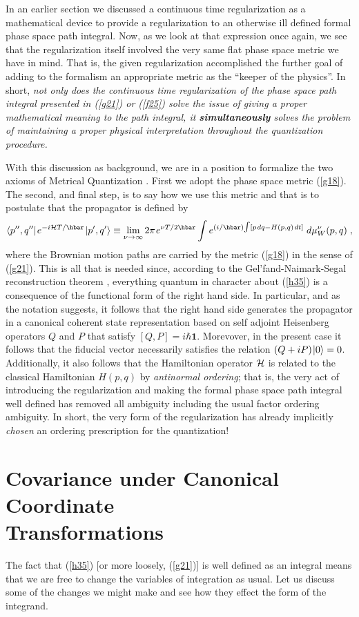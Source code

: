 \documentclass[12pt]{article}
\def\one{\mathbf 1}
\def\H{{\cal H}}
\def\ra{\rightarrow}
\def\tint{{\textstyle\int}}
\def\s{\hskip.08em}
\def\bn{\begin{eqnarray}}     %
\def\en{\end{eqnarray}}       %
\def\<{\langle}
\def\>{\rangle}
\begin{document}
In an earlier section we discussed a continuous time regularization as a 
mathematical device to provide a regularization to an otherwise ill 
defined formal phase space path integral. Now, as we look at that 
expression once again, we see that the regularization itself involved the 
very same flat phase space metric we have in mind. That is, the given 
regularization accomplished the further goal of adding to the formalism an 
appropriate metric as the ``keeper of the physics''. In short, {\it not 
only does the continuous time regularization of the phase space path 
integral presented in (\ref{g21}) or (\ref{f25}) solve the issue of giving 
a proper mathematical meaning to the path integral, it {\bf simultaneously} 
solves the problem of maintaining a proper physical interpretation 
throughout the quantization procedure.} 

With this discussion as background, we are in a position to formalize the 
two axioms of Metrical Quantization \cite{swe}. First we adopt the phase 
space metric (\ref{g18}). The second, and final step, is to say how we 
use this metric and that is to postulate that the propagator is defined by 
  \bn \<p'',q''|\s e^{-i\H T/\hbar}\s|p',q'\>\equiv
\lim_{\nu\ra\infty}2\pi\s e^{\nu T/2\hbar}\int 
e^{(i/\hbar)\tint[p\s dq-H(p,q)\s dt]}\;d\mu^\nu_W(p,q)\;, \label{h35}\en
where the Brownian motion paths are carried by the metric (\ref{g18}) in 
the sense of (\ref{g21}).
This is all that is needed since, according to the Gel'fand-Naimark-Segal 
reconstruction theorem \cite{emch}, everything quantum in character about 
(\ref{h35}) is a consequence of the functional form of the right hand side. 
In particular, and as the notation suggests, it follows that the right hand 
side generates the propagator in a canonical coherent state representation 
based on self adjoint Heisenberg operators $Q$ and $P$ that satisfy 
$[Q,P]=i\hbar\one$. Morevover, in the present case it follows that the 
fiducial vector necessarily satisfies the relation $(Q+iP)\s|0\>=0$. 
Additionally, it also follows that the Hamiltonian operator $\H$ is 
related to the classical Hamiltonian $H(p,q)$ by 
{\it antinormal ordering\/}; that is, the very act of introducing the 
regularization and making the formal phase space path integral well 
defined has removed all ambiguity including the usual factor ordering 
ambiguity. In short, the very form of the regularization has already 
implicitly {\it chosen} an ordering prescription for the quantization!

\section{Covariance under Canonical Coordinate \\Transformations}
The fact that (\ref{h35}) [or more loosely, (\ref{g21})] is well defined 
as an integral means that we are free to change the variables of 
integration as usual. Let us discuss some of the changes we might make 
and see how they effect the form of the integrand. 
\end{document}
